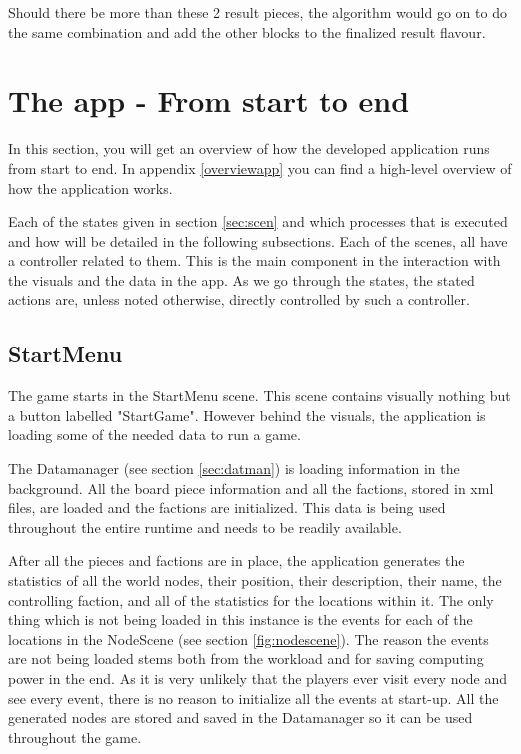 Should there be more than these 2 result pieces, the algorithm would go on to do the same combination and add the other blocks to the finalized result flavour.

\section{The app - From start to end}
In this section, you will get an overview of how the developed application runs from start to end. 
In appendix \ref{overviewapp} you can find a high-level overview of how the application works.

Each of the states given in section \ref{sec:scen} and which processes that is executed and how will be detailed in the following subsections.
Each of the scenes, all have a controller related to them. This is the main component in the interaction with the visuals and the data in the app. As we go through the states, the stated actions are, unless noted otherwise, directly controlled by such a controller.

\subsection{StartMenu}
The game starts in the StartMenu scene. This scene contains visually nothing but a button labelled "StartGame". 
However behind the visuals, the application is loading some of the needed data to run a game.

The Datamanager (see section \ref{sec:datman}) is loading information in the background. 
All the board piece information and all the factions, stored in xml files, are loaded and the factions are initialized. 
This data is being used throughout the entire runtime and needs to be readily available.

After all the pieces and factions are in place, the application generates the statistics of all the world nodes, their position, their description, their name, the controlling faction, and all of the statistics for the locations within it.
The only thing which is not being loaded in this instance is the events for each of the locations in the NodeScene (see section \ref{fig:nodescene}). The reason the events are not being loaded stems both from the workload and for saving computing power in the end. As it is very unlikely that the players ever visit every node and see every event, there is no reason to initialize all the events at start-up. 
All the generated nodes are stored and saved in the Datamanager so it can be used throughout the game.


